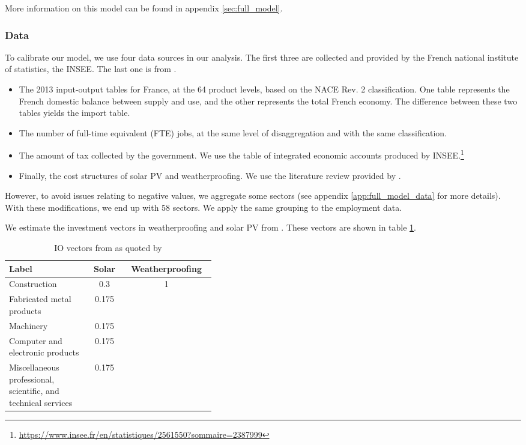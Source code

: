 More information on this model can be found in appendix \ref{sec:full_model}.

\subsubsection{Data}
To calibrate our model, we use four data sources in our analysis. The first three are collected and provided by the French national institute of statistics, the INSEE. The last one is from \citet{Garrett2017}.
\begin{itemize}
	\item The 2013 input-output tables for France, at the 64 product levels, based on the NACE Rev. 2 classification. One table represents the French domestic balance between supply and use, and the other represents the total French economy. The difference between these two tables yields the import table.
	\item The number of full-time equivalent (FTE) jobs, at the same level of disaggregation and with the same classification.
	\item The amount of tax collected by the government. We use the table of integrated economic accounts produced by INSEE.\footnote{\url{https://www.insee.fr/en/statistiques/2561550?sommaire=2387999}}
	\item Finally, the cost structures of solar PV and weatherproofing. We use the literature review provided by \citet{Garrett2017}.
\end{itemize}

However, to avoid issues relating to negative values, we aggregate some sectors (see appendix \ref{app:full_model_data} for more details). With these modifications, we end up with 58 sectors. We apply the same grouping to the employment data.

We estimate the investment vectors in weatherproofing and solar PV from \citet{Pollin2015}. These vectors are shown in table \ref{tab:IO_vectors}.

\begin{table}[!h]
	\centering
	\caption{IO vectors from \citet{Pollin2015} as quoted by \citet{Garrett2017}}
	\label{tab:IO_vectors}
	\begin{tabular}{p{0.4\linewidth}cc}
		\toprule
		Label  & Solar & Weatherproofing \\
		\midrule
		Construction& 0.3 & 1 \\
		Fabricated metal products& 0.175 &  \\
		Machinery& 0.175 &  \\
		Computer and electronic products& 0.175 &   \\
		Miscellaneous professional, scientific, and technical services& 0.175 &   \\
		\bottomrule
	\end{tabular}
\end{table}


